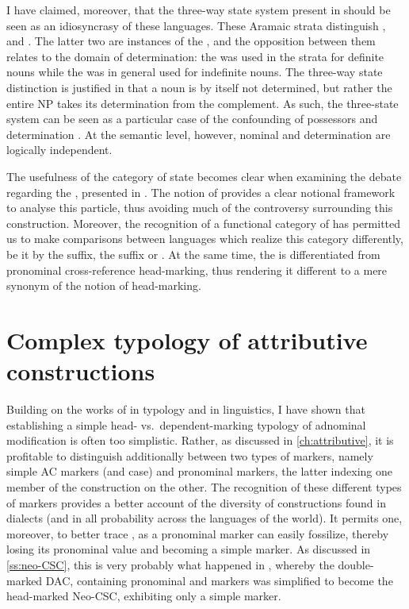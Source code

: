 I have claimed, moreover, that the three-way state system present in  should be seen as an idiosyncrasy of these languages. These Aramaic strata distinguish \cst*, \abs* and \emp*. The latter two are instances of the \free*, and the opposition between them relates to the domain of determination: the  was used in the  strata for definite nouns  while the  was in general used for indefinite nouns. The three-way state distinction is justified in that a  noun is by itself not determined, but rather the entire NP takes its determination from the complement. As such, the three-state system can be seen as a particular  case of the confounding of possessors and determination \citep[cf.][]{HaspelmathArticle}. At the semantic level, however, nominal  and determination are logically independent. 

The usefulness of the category of state becomes clear when examining the debate regarding the \Per \ez*, presented in . The notion of  provides a clear notional framework to analyse this particle, thus avoiding much of the controversy surrounding this construction. Moreover, the recognition of a functional category of  has permitted us to make comparisons between languages which realize this category differently, be it by the \ez* suffix, the \ed suffix or . At the same time, the \cst* is differentiated from pronominal cross-reference head-marking, thus rendering it different to a mere synonym of the notion of head-marking. 

\section{Complex typology of attributive constructions} \label{ss:complex_typolgoy}

Building on the works of \citet{PlankIntro} in typology and \citet[Ch.\ 14]{GoldenbergSemitic} in  linguistics, I have shown that establishing a simple head- vs.\ depen\-dent-marking typology of adnominal modification is often too simplistic. Rather, as discussed in \ref{ch:attributive}, it is profitable to distinguish additionally between two types of markers, namely simple AC markers (\cst* and \gen* case) and pronominal markers, the latter indexing one member of the construction on the other. The recognition of these different types of markers provides a better account of the diversity of constructions found in  dialects (and in all probability across the languages of the world). It permits one, moreover, to better trace , as a pronominal marker can easily fossilize, thereby losing its pronominal value and becoming a simple marker. As discussed in \ref{ss:neo-CSC}, this is very probably what happened in , whereby the double-marked DAC, containing  pronominal \prim and \secn markers was simplified to become the head-marked Neo-CSC, exhibiting only a simple \prim marker. 

